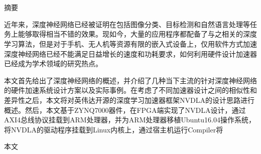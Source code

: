 \maketitle%
\chapter[摘要]{\MyTitleCh}
\setcounter{page}{1}%

\begin{center}
\vspace{-0.3cm}
 \songti 摘要
\vspace{0.3cm}
\end{center}

近年来，深度神经网络已经被证明在包括图像分类、目标检测和自然语言处理等任务上能够取得相当不错的效果。现如今，大量的应用程序都配备了与之相关的深度学习算法，但是对于手机、无人机等资源有限的嵌入式设备上，仅用软件方式加速深度神经网络已经不能满足日益增长的速度和功耗要求，如何利用硬件设计加速器已经成为学术领域的研究热点。

本文首先给出了深度神经网络的概述，并介绍了几种当下主流的针对深度神经网络的硬件加速系统设计方案以及实际事例。在考虑了不同加速器设计之间的相似性和差异性之后，本文将对英伟达开源的深度学习加速器框架NVDLA的设计思路进行概述。然后，本文基于ZYNQ7000器件，在FPGA端实现了NVDLA设计，通过AXI4总线协议挂载到ARM处理器，并为ARM处理器移植Ubuntu16.04操作系统，将NVDLA的驱动程序挂载到Linux内核上，通过宿主机运行Compiler将

本文

{
}
